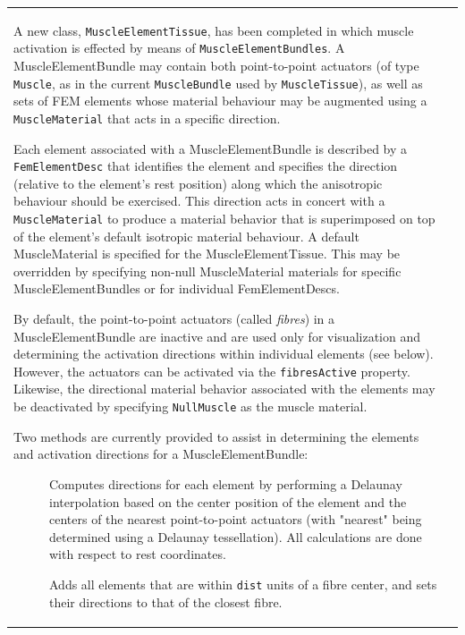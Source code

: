 \documentclass{article}
\begin{document}
\begin{tabular}{ll}
A new class, {\tt MuscleElementTissue}, has been completed in which muscle
activation is effected by means of {\tt MuscleElement\-Bundles}. A
MuscleElementBundle may contain both point-to-point actuators (of type
{\tt Muscle}, as in the current {\tt MuscleBundle} used by {\tt MuscleTissue}), as
well as sets of FEM elements whose material behaviour may be augmented
using a {\tt MuscleMaterial} that acts in a specific direction.

Each element associated with a MuscleElementBundle is described by a
{\tt FemElementDesc} that identifies the element and specifies the
direction (relative to the element's rest position) along which the
anisotropic behaviour should be exercised. This direction acts in
concert with a {\tt MuscleMaterial} to produce a material behavior that is
superimposed on top of the element's default isotropic material
behaviour. A default MuscleMaterial is specified for the
MuscleElementTissue. This may be overridden by specifying non-null
MuscleMaterial materials for specific MuscleElementBundles or for
individual FemElementDescs.

By default, the point-to-point actuators (called {\it fibres}) in a
MuscleElementBundle are inactive and are used only for visualization
and determining the activation directions within individual elements
(see below).  However, the actuators can be activated via the
{\tt fibresActive} property. Likewise, the directional material behavior
associated with the elements may be deactivated by specifying
{\tt NullMuscle} as the muscle material.

Two methods are currently provided to assist in determining the
elements and activation directions for a MuscleElementBundle:

\begin{description}

\item[{\tt computeElementDirections()}]  \mbox{}

Computes directions for each element by performing a Delaunay
interpolation based on the center position of the element and the
centers of the nearest point-to-point actuators (with "nearest" being
determined using a Delaunay tessellation). All calculations are done
with respect to rest coordinates.

\item[{\tt addElementsNearFibres(dist)}] \mbox{}

Adds all elements that are within {\tt dist} units of a fibre center, and
sets their directions to that of the closest fibre.


\end{description}
\end{tabular}
\end{document}
